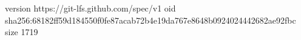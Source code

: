 version https://git-lfs.github.com/spec/v1
oid sha256:68182ff59d184550f0fe87acab72b4e19da767e8648b0924024442682ae92fbc
size 1719
